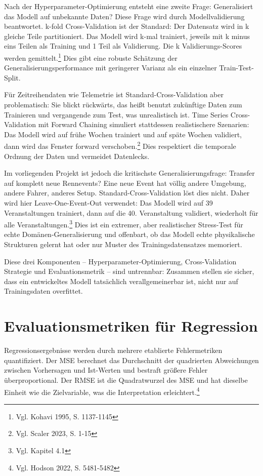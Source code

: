 Nach der Hyperparameter-Optimierung entsteht eine zweite Frage: Generalisiert das Modell auf unbekannte Daten? Diese Frage wird durch Modellvalidierung beantwortet. k-fold Cross-Validation ist der Standard: Der Datensatz wird in k gleiche Teile partitioniert. Das Modell wird k-mal trainiert, jeweils mit k minus eins Teilen als Training und 1 Teil als Validierung. Die k Validierungs-Scores werden gemittelt.\footnote{Vgl. Kohavi 1995, S. 1137-1145} Dies gibt eine robuste Schätzung der Generalisierungsperformance mit geringerer Varianz als ein einzelner Train-Test-Split.

Für Zeitreihendaten wie Telemetrie ist Standard-Cross-Validation aber problematisch: Sie blickt rückwärts, das heißt benutzt zukünftige Daten zum Trainieren und vergangende zum Test, was unrealistisch ist. Time Series Cross-Validation mit Forward Chaining simuliert stattdessen realistischere Szenarien: Das Modell wird auf frühe Wochen trainiert und auf späte Wochen validiert, dann wird das Fenster forward verschoben.\footnote{Vgl. Scaler 2023, S. 1-15} Dies respektiert die temporale Ordnung der Daten und vermeidet Datenlecks.

Im vorliegenden Projekt ist jedoch die kritischste Generalisierungsfrage: Transfer auf komplett neue Rennevents? Eine neue Event hat völlig andere Umgebung, andere Fahrer, anderes Setup. Standard-Cross-Validation löst dies nicht. Daher wird hier Leave-One-Event-Out verwendet: Das Modell wird auf 39 Veranstaltungen trainiert, dann auf die 40. Veranstaltung validiert, wiederholt für alle Veranstaltungen.\footnote{Vgl. Kapitel 4.1} Dies ist ein extremer, aber realistischer Stress-Test für echte Domänen-Generalisierung und offenbart, ob das Modell echte physikalische Strukturen gelernt hat oder nur Muster des Trainingsdatensatzes memoriert.

Diese drei Komponenten – Hyperparameter-Optimierung, Cross-Validation Strategie und Evaluationsmetrik – sind untrennbar: Zusammen stellen sie sicher, dass ein entwickeltes Modell tatsächlich verallgemeinerbar ist, nicht nur auf Trainingsdaten overfittet.


\section{Evaluationsmetriken für Regression}

Regressionsergebnisse werden durch mehrere etablierte Fehlermetriken quantifiziert. Der \ac{MSE} berechnet das Durchschnitt der quadrierten Abweichungen zwischen Vorhersagen und Ist-Werten und bestraft größere Fehler überproportional. Der \ac{RMSE} ist die Quadratwurzel des MSE und hat dieselbe Einheit wie die Zielvariable, was die Interpretation erleichtert.\footnote{Vgl. Hodson 2022, S. 5481-5482}

